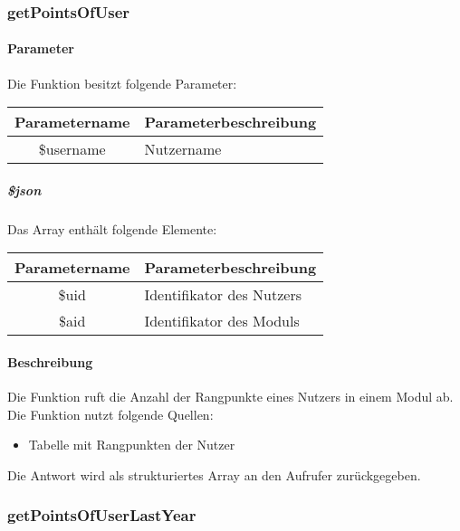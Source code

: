 \subsubsection{getPointsOfUser}
\paragraph{Parameter} Die Funktion besitzt folgende Parameter:
\begin{table}[H]
	\begin{tabular}{|c|p{11cm}|}
		\hline
		\textbf{Parametername} & \textbf{Parameterbeschreibung} \\ \hline
		\$username & Nutzername \\ \hline
	\end{tabular}
\end{table}
\subparagraph{\$json}Das Array enthält folgende Elemente:
\begin{table}[H]
	\begin{tabular}{|c|p{11cm}|}
		\hline
		\textbf{Parametername} & \textbf{Parameterbeschreibung} \\ \hline
		\$uid   & Identifikator des Nutzers \\ \hline
		\$aid   & Identifikator des Moduls \\ \hline
	\end{tabular}
\end{table}
\paragraph{Beschreibung} Die Funktion ruft die Anzahl der Rangpunkte eines Nutzers in einem Modul ab. Die Funktion nutzt folgende Quellen:
\begin{itemize}
	\item Tabelle mit Rangpunkten der Nutzer
\end{itemize}
Die Antwort wird als strukturiertes Array an den Aufrufer zurückgegeben.
\subsubsection{getPointsOfUserLastYear}
